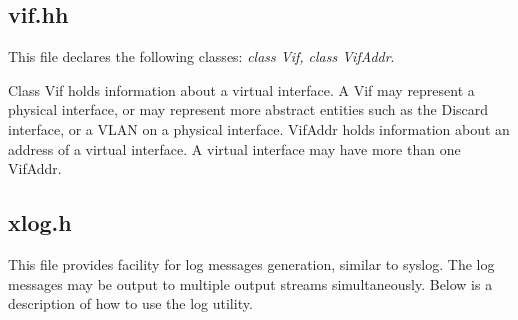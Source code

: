 \documentclass[11pt]{article}
\begin{document}
\subsection{vif.hh}

This file declares the following classes: \emph{class Vif, class
VifAddr}.

Class Vif holds information about a virtual interface.  A Vif may
represent a physical interface, or may represent more abstract
entities such as the Discard interface, or a VLAN on a physical
interface.
VifAddr holds information about an address of a virtual interface.
A virtual interface may have more than one VifAddr.

\subsection{xlog.h}

This file provides facility for log messages generation, similar to
syslog. The log messages may be output to multiple output streams
simultaneously. Below is a description of how to use the log utility.
\end{document}
